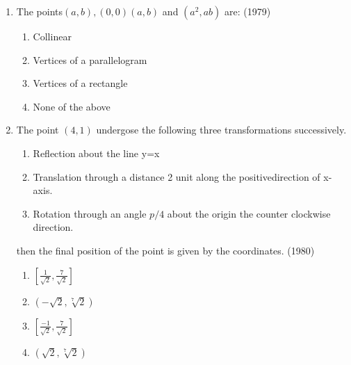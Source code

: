 \documentclass[12pt]{article}
\providecommand{\brak}[1]{\ensuremath{\left(#1\right)}}
\providecommand{\sbrak}[1]{\ensuremath{{}\left[#1\right]}}
\begin{document}
\begin{enumerate}
\item The points$(a,b),(0,0)(a,b)$ and $(a^2,ab)$ are: (1979)
\begin{enumerate}
\item Collinear
\item Vertices of a parallelogram
\item Vertices of a rectangle
\item None of the above
\end{enumerate}
\item The point $(4,1)$ undergose the following three transformations successively.
\begin{enumerate}[i]
\item Reflection about the line y=x\\
\item Translation through a distance 2 unit along the positivedirection of x-axis.\\
\item Rotation through an angle $p/4$ about the origin the counter clockwise direction.\\
\end{enumerate}

then the final position of the point is given by the coordinates. (1980)
\begin{enumerate}
\item  $\sbrak{\frac{1}{\sqrt{2}},\frac{7}{\sqrt{2}}}$
\item  $\brak{-\sqrt{2}, \sqrt[7]{2}}$  
\item  $\sbrak{\frac{-1}{\sqrt{2}},\frac{7}{\sqrt{2}}}$
\item  $\brak{\sqrt{2}, \sqrt[7]{2}}$
\end{enumerate}


\end{enumerate}
\end{document}
